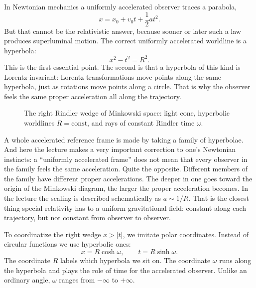 In Newtonian mechanics a uniformly accelerated observer traces a parabola,
\[
x=x_0+v_0 t+\frac12 at^2.
\]
But that cannot be the relativistic answer, because sooner or later such a law produces superluminal motion. The correct uniformly accelerated worldline is a hyperbola:
\begin{equation}
x^2-t^2=R^2.
\end{equation}
This is the first essential point. The second is that a hyperbola of this kind is Lorentz-invariant: Lorentz transformations move points along the same hyperbola, just as rotations move points along a circle. That is why the observer feels the same proper acceleration all along the trajectory.

\begin{figure}[t]
\centering
{}
\caption{The right Rindler wedge of Minkowski space: light cone, hyperbolic worldlines \(R=\text{const}\), and rays of constant Rindler time \(\omega\).}
\end{figure}

A whole accelerated reference frame is made by taking a family of hyperbolae. And here the lecture makes a very important correction to one's Newtonian instincts: a ``uniformly accelerated frame'' does not mean that every observer in the family feels the same acceleration. Quite the opposite. Different members of the family have different proper accelerations. The deeper in one goes toward the origin of the Minkowski diagram, the larger the proper acceleration becomes. In the lecture the scaling is described schematically as \(a\sim 1/R\). That is the closest thing special relativity has to a uniform gravitational field: constant along each trajectory, but not constant from observer to observer.

To coordinatize the right wedge \(x>|t|\), we imitate polar coordinates. Instead of circular functions we use hyperbolic ones:
\begin{equation}
x=R\cosh\omega,
\qquad
t=R\sinh\omega.
\end{equation}
The coordinate \(R\) labels which hyperbola we sit on. The coordinate \(\omega\) runs along the hyperbola and plays the role of time for the accelerated observer. Unlike an ordinary angle, \(\omega\) ranges from \(-\infty\) to \(+\infty\).

